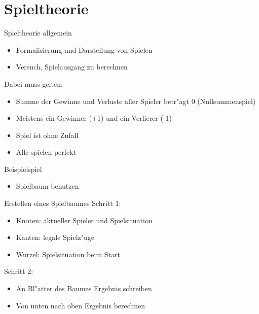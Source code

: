 \documentclass[18pt]{beamer}
\begin{document}
\section{Spieltheorie}
\begin{frame}{Spieltheorie allgemein}
\begin{itemize}
\item Formalisierung und Darstellung von Spielen
\item Versuch, Spielausgang zu berechnen
\end{itemize}
Dabei muss gelten:
\begin{itemize}
\item Summe der Gewinne und Verluste aller Spieler betr"agt 0 (Nullsummenspiel)
\item Meistens ein Gewinner (+1) und ein Verlierer (-1)
\item Spiel ist ohne Zufall
\item Alle spielen perfekt
\end{itemize}
\end{frame}

\begin{frame}{Beispielspiel}
\begin{itemize}
\begin{block}{simples Beispielspiel}
Alice und Bob haben sechs M"unzen in der Mitte liegen und nehmen abwechselnd je eine bis drei davon. Wer die letzte M"unze nimmt, gewinnt.
\end{block}
\item Spielbaum benutzen
\end{itemize}
\end{frame}

\begin{frame}{Erstellen eines Spielbaumes}
Schritt 1:
\begin{itemize}
\item Knoten: aktueller Spieler und Spielsituation
\item Kanten: legale Spielz"uge
\item Wurzel: Spielsituation beim Start
\end{itemize}
\pause
Schritt 2:
\begin{itemize}
\item An Bl"atter des Baumes Ergebnis schreiben
\item Von unten nach oben Ergebnis berechnen
\end{itemize}
\end{frame}
\end{document}

